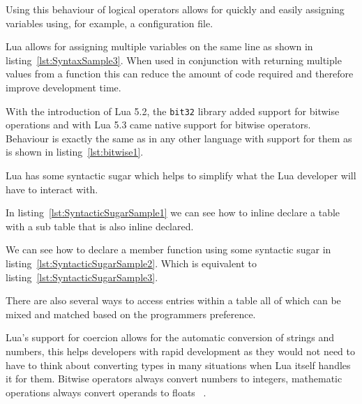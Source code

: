 \documentclass[11pt,a4paper,titlepage]{report}
\begin{document}
	Using this behaviour of logical operators allows for quickly and easily assigning variables using, for example, a configuration file.

	Lua allows for assigning multiple variables on the same line as shown in listing~\ref{lst:SyntaxSample3}. When used in conjunction with returning multiple values from a function this can reduce the amount of code required and therefore improve development time.
	 

	With the introduction of Lua 5.2, the \texttt{bit32} library added support for bitwise operations and with Lua 5.3 came native support for bitwise operators. Behaviour is exactly the same as in any other language with support for them as is shown in listing~\ref{lst:bitwise1}.
	 

	Lua has some syntactic sugar which helps to simplify what the Lua developer will have to interact with.
	
	
	In listing~\ref{lst:SyntacticSugarSample1} we can see how to inline declare a table with a sub table that is also inline declared.

	
	We can see how to declare a member function using some syntactic sugar in listing~\ref{lst:SyntacticSugarSample2}. Which is equivalent to listing~\ref{lst:SyntacticSugarSample3}.

	

	There are also several ways to access entries within a table all of which can be mixed and matched based on the programmers preference.

	

	Lua's support for coercion allows for the automatic conversion of strings and numbers, this helps developers with rapid development as they would not need to have to think about converting types in many situations when Lua itself handles it for them. Bitwise operators always convert numbers to integers, mathematic operations always convert operands to floats ~\cite{LuaMan}.
	
\end{document}
